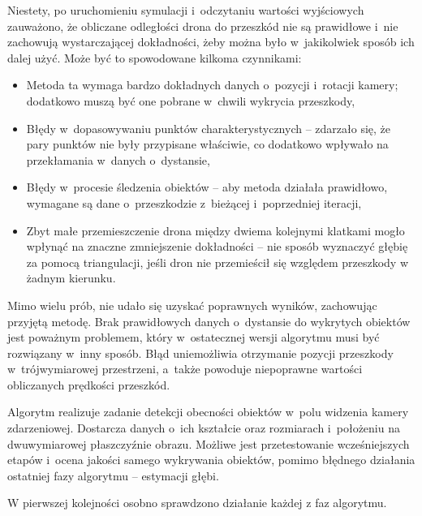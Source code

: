 \vspace{11px}
Niestety, po uruchomieniu symulacji i~odczytaniu wartości wyjściowych zauważono, że obliczane odległości drona do przeszkód nie są prawidłowe i~nie zachowują wystarczającej dokładności, żeby można było w~jakikolwiek sposób ich dalej użyć. Może być to spowodowane kilkoma czynnikami:
\begin{itemize}
    \item Metoda ta wymaga bardzo dokładnych danych o~pozycji i~rotacji kamery; dodatkowo muszą być one pobrane w~chwili wykrycia przeszkody,
    \item Błędy w~dopasowywaniu punktów charakterystycznych -- zdarzało się, że pary punktów nie były przypisane właściwie, co dodatkowo wpływało na przekłamania w~danych o~dystansie,
    \item Błędy w~procesie śledzenia obiektów -- aby metoda działała prawidłowo, wymagane są dane o~przeszkodzie z~bieżącej i~poprzedniej iteracji,
    \item Zbyt małe przemieszczenie drona między dwiema kolejnymi klatkami mogło wpłynąć na znaczne zmniejszenie dokładności -- nie sposób wyznaczyć głębię za pomocą triangulacji, jeśli dron nie przemieścił się względem przeszkody w żadnym kierunku.
\end{itemize}


Mimo wielu prób, nie udało się uzyskać poprawnych wyników, zachowując przyjętą metodę.
Brak prawidłowych danych o~dystansie do wykrytych obiektów jest poważnym problemem, który w~ostatecznej wersji algorytmu musi być rozwiązany w~inny sposób. %
Błąd uniemożliwia otrzymanie pozycji przeszkody w~trójwymiarowej przestrzeni, a~także powoduje niepoprawne wartości obliczanych prędkości przeszkód.


Algorytm realizuje zadanie detekcji obecności obiektów w~polu widzenia kamery zdarzeniowej. Dostarcza danych o~ich kształcie oraz rozmiarach i~położeniu na dwuwymiarowej płaszczyźnie obrazu. Możliwe jest przetestowanie wcześniejszych etapów i~ocena jakości samego wykrywania obiektów, pomimo błędnego działania ostatniej fazy algorytmu -- estymacji głębi.

\vspace{11px}
W pierwszej kolejności osobno sprawdzono działanie każdej z faz algorytmu.

